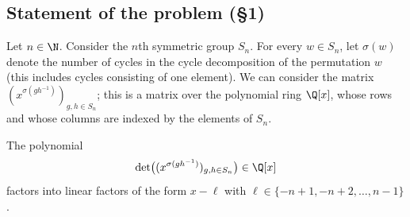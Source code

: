 
\subsection*{Statement of the problem (\S1)}
Let $n\in\N$. Consider the $n$th symmetric group $S_n$. For every $w\in S_n$, let $\sigma(w)$ denote the number of cycles in the cycle decomposition of the permutation $w$ (this includes cycles consisting of one element). We can consider the matrix $(x^{\sigma(gh^{-1})})_{g,h\in S_n}$; this is a matrix over the polynomial ring $\Q[x]$, whose rows and whose columns are indexed by the elements of $S_n$.
\begin{theorem}[1]
The polynomial
\[
\det\bigl((x^{\sigma(gh^{-1})})_{g,h\in S_n}\bigr)\in\Q[x]
\]
factors into linear factors of the form $x-\ell$ with $\ell\in\{-n+1,-n+2,\ldots,n-1\}$.
\end{theorem}

